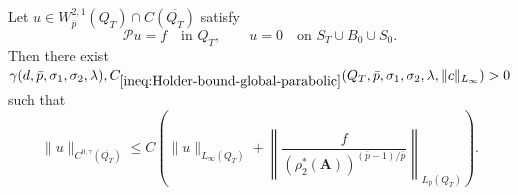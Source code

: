 \documentclass[final,onefignum,onetabnum]{mousaviart}
\begin{document}
	\begin{lemma}
		\label{lemm-Holder-continuity-parabolic}
		Let $ u \in W^{2,1}_{\bar p}(Q_T)\cap C(\overline{Q_T})$
		satisfy
		\[
		\mathcal{P}u=f
		\quad \text{in } Q_T,
		\qquad
		u=0
		\quad \text{on } S_T\cup B_0\cup S_0 .
		\]
		Then there exist $
		\gamma(d,\bar p,\sigma_1,\sigma_2,\lambda),
		C_{\ref{ineq:Holder-bound-global-parabolic}}(Q_T,\bar p,\sigma_1,\sigma_2,\lambda,\|c\|_{L_\infty})>0$
		such that
		\begin{equation}
			\label{ineq:Holder-bound-global-parabolic}
			\|u\|_{C^{0,\gamma}(\overline{Q_T})}
			\le
			C
			\left(
			\|u\|_{L_\infty(Q_T)}
			+
			\left\|
			\frac{f}
			{
				\left(
				\rho_2^\ast(\boldsymbol A)
				\right)^{(\bar p-1)/\bar p}
			}
			\right\|_{L_{\bar p}(Q_T)}
			\right).
		\end{equation}
	\end{lemma}
	
\end{document}
